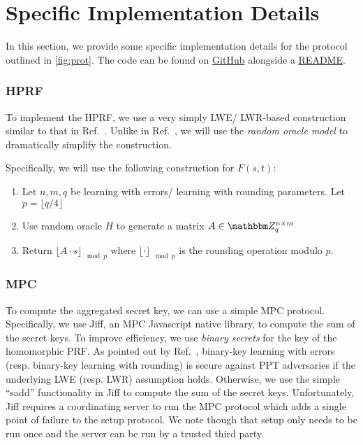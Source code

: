 \section{Specific Implementation Details}
In this section, we provide some specific implementation details for the protocol outlined in \cref{fig:prot}.
The code can be found on \href{https://github.com/Lev-Stambler/CoN-Diff/tree/master/code}{GitHub} alongside a \href{https://github.com/Lev-Stambler/CoN-Diff/blob/master/Readme.md}{README}.

\subsubsection*{HPRF}
To implement the HPRF, we use a very simply LWE/ LWR-based construction similar to that in Ref.~\cite{boneh2013key}.
Unlike in Ref.~\cite{boneh2013key}, we will use the \emph{random oracle model} to dramatically simplify the construction.

Specifically, we will use the following construction for $F(s, t)$:
\begin{enumerate}
	\item Let $n, m, q$ be learning with errors/ learning with rounding parameters.
		Let $p = \lfloor q / 4 \rfloor$
	\item Use random oracle $H$ to generate a matrix $A \in \Z_q^{n \times m}$
	\item Return $\lfloor A \cdot s \rfloor_{\mod p}$ where $\lfloor \cdot \rfloor_{\mod p}$ is the rounding operation modulo $p$.
\end{enumerate}

\subsubsection*{MPC}
To compute the aggregated secret key, we can use a simple MPC protocol.
Specifically, we use Jiff, an MPC Javascript native library, to compute the sum of the secret keys.
To improve efficiency, we use \emph{binary secrets} for the key of the homomorphic PRF.
As pointed out by Ref.~\cite{micciancio2018hardness}, binary-key learning with errors (resp. binary-key learning with rounding) is secure against PPT adversaries if the underlying LWE (resp. LWR) assumption holds.
Otherwise, we use the simple ``sadd'' functionality in Jiff to compute the sum of the secret keys.
Unfortunately, Jiff requires a coordinating server to run the MPC protocol which adds a single point of failure to the setup protocol.
We note though that setup only needs to be run once and the server can be run by a trusted third party.

